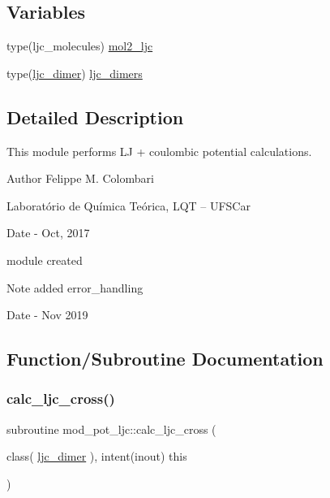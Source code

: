 \subsection*{Variables}
\begin{DoxyCompactItemize}
\item 
type(ljc\+\_\+molecules) \hyperlink{namespacemod__pot__ljc_a1e6c4de2f430e31de30d11b03267a4d9}{mol2\+\_\+ljc}
\item 
type(\hyperlink{structmod__pot__ljc_1_1ljc__dimer}{ljc\+\_\+dimer}) \hyperlink{namespacemod__pot__ljc_a6c45700ba481536007711306e5c21e0c}{ljc\+\_\+dimers}
\end{DoxyCompactItemize}


\subsection{Detailed Description}
This module performs LJ + coulombic potential calculations. 

\begin{DoxyAuthor}{Author}
Felippe M. Colombari
\begin{DoxyItemize}
\item Laboratório de Química Teórica, L\+QT -- U\+F\+S\+Car 
\end{DoxyItemize}
\end{DoxyAuthor}
\begin{DoxyDate}{Date}
-\/ Oct, 2017
\begin{DoxyItemize}
\item module created 
\end{DoxyItemize}
\end{DoxyDate}
\begin{DoxyNote}{Note}
added error\+\_\+handling 
\end{DoxyNote}
\begin{DoxyDate}{Date}
-\/ Nov 2019 
\end{DoxyDate}


\subsection{Function/\+Subroutine Documentation}
\mbox{\label{namespacemod__pot__ljc_aea69edf70ec804ebb8075741c84ab50b}} 
\subsubsection{\texorpdfstring{calc\+\_\+ljc\+\_\+cross()}{calc\_ljc\_cross()}}
{\footnotesize\ttfamily subroutine mod\+\_\+pot\+\_\+ljc\+::calc\+\_\+ljc\+\_\+cross (\begin{DoxyParamCaption}\item[{class( \hyperlink{structmod__pot__ljc_1_1ljc__dimer}{ljc\+\_\+dimer} ), intent(inout)}]{this }\end{DoxyParamCaption})}



